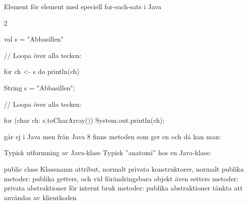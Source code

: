 \begin{Slide}{Element för element med speciell for-each-sats i Java}
\begin{multicols}{2}
\noindent{}
\begin{CodeSmall}[basicstyle=\ttfamily\SlideFontSize{6}{8},backgroundcolor=\color{white},
  frame=none]
val s = "Abbasillen"

// Loopa över alla tecken:

for ch <- s do println(ch)


\end{CodeSmall}

\columnbreak

\noindent{}
\begin{CodeSmall}[language=Java,basicstyle=\ttfamily\SlideFontSize{6}{8},backgroundcolor=\color{white},
  frame=none]
String s = "Abbasillen";

// Loopa över alla tecken:

for (char ch: s.toCharArray()) {
    System.out.println(ch);
}
\end{CodeSmall}
\end{multicols}

\pause
{\noindent\SlideFontSmall
{} går ej i Java men
från Java 8 finns metoden  som ger en  och då kan man: \\
 }
\end{Slide}






\begin{Slide}{Typisk utformning av Java-klass}
Typisk ''anatomi'' hos en Java-klass:
\begin{Code}[language=Java]
public class Klassnamn {
    attribut, normalt privata
    konstruktorer, normalt publika
    metoder: publika getters, och vid förändringsbara objekt även setters
    metoder: privata abstraktioner för internt bruk
    metoder: publika abstraktioner tänkta att användas av klientkoden
}
\end{Code}
\end{Slide}


